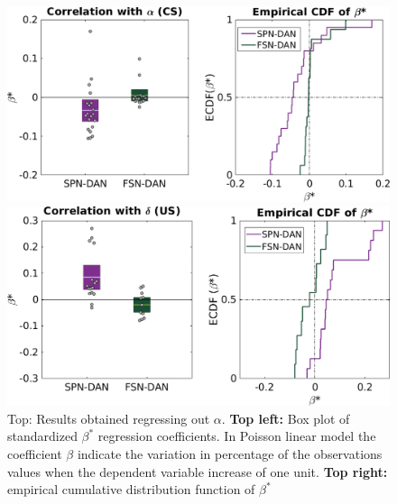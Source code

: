 \begin{figure}[!h]
    \centering
    \includegraphics[scale=0.45]{figures/alphaRegrNew3.png}
    
    \vspace{1cm}
    \includegraphics[scale=0.45]{figures/deltaRegr3.png}
    \caption{Top: Results obtained regressing out $\alpha$. \textbf{Top left:} Box plot of standardized $\beta^*$ regression coefficients. In Poisson linear model the coefficient $\beta$ indicate the variation in percentage of the observations values when the dependent variable increase of one unit. \textbf{Top right:} empirical cumulative distribution function of $\beta^*$}
    \label{fig:AlphaDeltaReg}
\end{figure}\\
